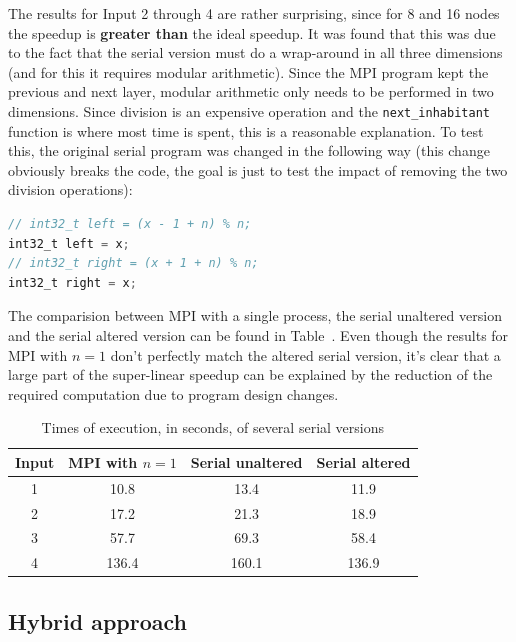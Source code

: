 \documentclass{article}
\begin{document}
The results for Input 2 through 4 are rather surprising, since for 8 and 16 nodes
the speedup is \textbf{greater than} the ideal speedup. It was found that this was
due to the fact that the serial version must do a wrap-around in all three dimensions
(and for this it requires modular arithmetic). Since the MPI program kept the
previous and next layer, modular arithmetic only needs to be performed in two
dimensions. Since division is an expensive operation and the \texttt{next\_inhabitant}
function is where most time is spent, this is a reasonable explanation. To test
this, the original serial program was changed in the following way (this change
obviously breaks the code, the goal is just to test the impact of removing the
two division operations):

\begin{lstlisting}[language=C,caption={Change to serial code}]
// int32_t left = (x - 1 + n) % n;
int32_t left = x;
// int32_t right = (x + 1 + n) % n;
int32_t right = x;
\end{lstlisting}

The comparision between MPI with a single process, the serial unaltered version
and the serial altered version can be found in Table~\cite{tbl:serial-times}.
Even though the results for MPI with $n=1$ don't perfectly match the altered serial
version, it's clear that a large part of the super-linear speedup can be explained
by the reduction of the required computation due to program design changes.

\begin{table}[h!]
	\centering
	\begin{tabular}{||c c c c||} 
	 \hline
	 Input & MPI with $n=1$ & Serial unaltered & Serial altered \\ [0.5ex] 
	 \hline
	 1 & 10.8 & 13.4 & 11.9 \\  [1ex] 
	 2 & 17.2 & 21.3 & 18.9 \\  [1ex] 
	 3 & 57.7 & 69.3 & 58.4 \\  [1ex] 
	 4 & 136.4 & 160.1 & 136.9 \\  [1ex] 
	 \hline
	\end{tabular}
	\caption{Times of execution, in seconds, of several serial versions}
	\label{tbl:serial-times}
\end{table}

\subsection{Hybrid approach}
\end{document}
